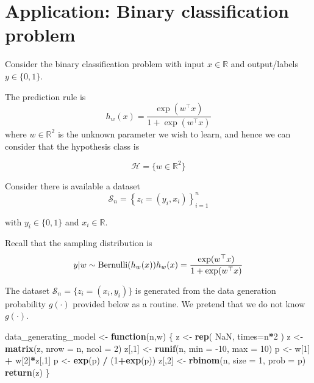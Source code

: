 \documentclass[
]{article}
\newenvironment{Shaded}{\begin{snugshade}}{\end{snugshade}}
\newcommand{\ControlFlowTok}[1]{\textcolor[rgb]{0.13,0.29,0.53}{\textbf{#1}}}
\newcommand{\DataTypeTok}[1]{\textcolor[rgb]{0.13,0.29,0.53}{#1}}
\newcommand{\DecValTok}[1]{\textcolor[rgb]{0.00,0.00,0.81}{#1}}
\newcommand{\KeywordTok}[1]{\textcolor[rgb]{0.13,0.29,0.53}{\textbf{#1}}}
\newcommand{\NormalTok}[1]{#1}
\newcommand{\OperatorTok}[1]{\textcolor[rgb]{0.81,0.36,0.00}{\textbf{#1}}}
\newcommand{\OtherTok}[1]{\textcolor[rgb]{0.56,0.35,0.01}{#1}}
\newcommand{\StringTok}[1]{\textcolor[rgb]{0.31,0.60,0.02}{#1}}
\begin{document}
\hypertarget{application-binary-classification-problem}{%
\section*{Application: Binary classification
problem}\label{application-binary-classification-problem}}

Consider the binary classification problem with input \(x\in\mathbb{R}\)
and output/labels \(y\in\{0,1\}\).

The prediction rule is \[
h_{w}(x) = \frac {\exp(w^\top x)}{1+\exp(w^\top x)}
\] where \(w\in\mathbb{R}^{2}\) is the unknown parameter we wish to
learn, and hence we can consider that the hypothesis class is

\[
\mathcal{H}=\{w\in\mathbb{R}^{2}\}
\]

Consider there is available a dataset\\
\[
\mathcal{S}_{n}=\left\{ z_{i}=\left(y_{i},x_{i}\right)\right\} _{i=1}^{n}
\]

with \(y_{i}\in\{0,1\}\) and \(x_{i}\in\mathbb{R}\).

Recall that the sampling distribution is\\
\[
y|w \sim \text{Bernulli}(h_{w}(x)) \\
h_{w}(x) = \frac {\exp(w^\top x)}{1+\exp(w^\top x)}
\]

The dataset \(\mathcal{S}_{n}=\{z_i=(x_i,y_i)\}\) is generated from the
data generation probability \(g(\cdot)\) provided below as a routine. We
pretend that we do not know \(g(\cdot)\).

\begin{Shaded}
\begin{Highlighting}[]
\NormalTok{data\_generating\_model \textless{}{-}}\StringTok{ }\ControlFlowTok{function}\NormalTok{(n,w) \{}
\NormalTok{  z \textless{}{-}}\StringTok{ }\KeywordTok{rep}\NormalTok{( }\OtherTok{NaN}\NormalTok{, }\DataTypeTok{times=}\NormalTok{n}\OperatorTok{*}\DecValTok{2}\NormalTok{ )}
\NormalTok{  z \textless{}{-}}\StringTok{ }\KeywordTok{matrix}\NormalTok{(z, }\DataTypeTok{nrow =}\NormalTok{ n, }\DataTypeTok{ncol =} \DecValTok{2}\NormalTok{)}
\NormalTok{  z[,}\DecValTok{1}\NormalTok{] \textless{}{-}}\StringTok{ }\KeywordTok{runif}\NormalTok{(n, }\DataTypeTok{min =} \DecValTok{{-}10}\NormalTok{, }\DataTypeTok{max =} \DecValTok{10}\NormalTok{)}
\NormalTok{  p \textless{}{-}}\StringTok{ }\NormalTok{w[}\DecValTok{1}\NormalTok{] }\OperatorTok{+}\StringTok{ }\NormalTok{w[}\DecValTok{2}\NormalTok{]}\OperatorTok{*}\NormalTok{z[,}\DecValTok{1}\NormalTok{] }
\NormalTok{  p \textless{}{-}}\StringTok{ }\KeywordTok{exp}\NormalTok{(p) }\OperatorTok{/}\StringTok{ }\NormalTok{(}\DecValTok{1}\OperatorTok{+}\KeywordTok{exp}\NormalTok{(p))}
\NormalTok{  z[,}\DecValTok{2}\NormalTok{] \textless{}{-}}\StringTok{ }\KeywordTok{rbinom}\NormalTok{(n, }\DataTypeTok{size =} \DecValTok{1}\NormalTok{, }\DataTypeTok{prob =}\NormalTok{ p)}
  \KeywordTok{return}\NormalTok{(z)}
\NormalTok{\}}
\end{Highlighting}
\end{Shaded}
\end{document}
